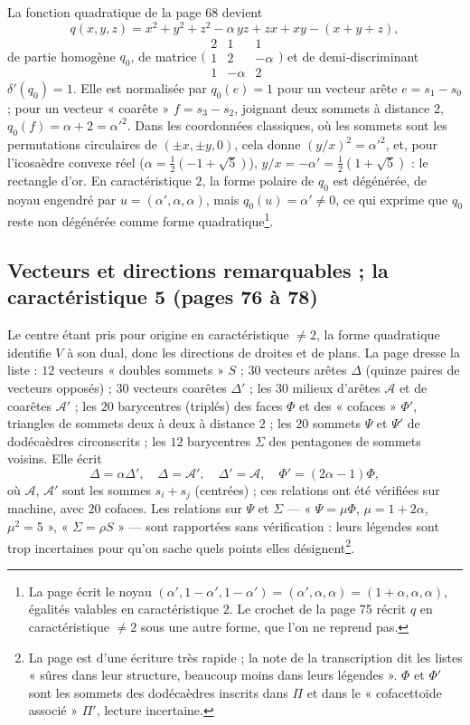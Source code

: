\documentclass[11pt,a4paper]{article}
\begin{document}
La fonction quadratique de la page 68 devient
\[
q(x, y, z) = x^2 + y^2 + z^2 - \alpha\,yz + zx + xy - (x + y + z) ,
\]
de partie homogène $q_0$, de matrice $\bigl(\begin{smallmatrix} 2 & 1 & 1 \\ 1 & 2
& -\alpha \\ 1 & -\alpha & 2 \end{smallmatrix}\bigr)$ et de demi-discriminant
$\delta'(q_0) = 1$. Elle est normalisée par $q_0(e) = 1$ pour un vecteur arête
$e = s_1 - s_0$ ; pour un vecteur « coarête » $f = s_3 - s_2$, joignant deux
sommets à distance $2$, $q_0(f) = \alpha + 2 = \alpha'^2$. Dans les coordonnées
classiques, où les sommets sont les permutations circulaires de $(\pm x, \pm y,
0)$, cela donne $(y/x)^2 = \alpha'^2$, et, pour l'icosaèdre convexe réel ($\alpha
= \tfrac12(-1 + \sqrt 5)$), $y/x = -\alpha' = \tfrac12(1 + \sqrt 5)$ : le
rectangle d'or. En caractéristique $2$, la forme polaire de $q_0$ est
dégénérée, de noyau engendré par $u = (\alpha', \alpha, \alpha)$, mais $q_0(u) =
\alpha' \neq 0$, ce qui exprime que $q_0$ reste non dégénérée comme forme
quadratique\footnote{La page écrit le noyau $(\alpha', 1 - \alpha', 1 - \alpha')
= (\alpha', \alpha, \alpha) = (1 + \alpha, \alpha, \alpha)$, égalités valables en
caractéristique $2$. Le crochet de la page 75 récrit $q$ en caractéristique
$\neq 2$ sous une autre forme, que l'on ne reprend pas.}.

\subsection*{Vecteurs et directions remarquables ; la caractéristique 5 (pages 76 à 78)}

Le centre étant pris pour origine en caractéristique $\neq 2$, la forme
quadratique identifie $V$ à son dual, donc les directions de droites et de
plans. La page dresse la liste : $12$ vecteurs « doubles sommets » $S$ ; $30$
vecteurs arêtes $\Delta$ (quinze paires de vecteurs opposés) ; $30$ vecteurs
coarêtes $\Delta'$ ; les $30$ milieux d'arêtes $\mathcal{A}$ et de coarêtes
$\mathcal{A}'$ ; les $20$ barycentres (triplés) des faces $\Phi$ et des
« cofaces » $\Phi'$, triangles de sommets deux à deux à distance $2$ ; les
$20$ sommets $\Psi$ et $\Psi'$ de dodécaèdres circonscrits ; les $12$
barycentres $\Sigma$ des pentagones de sommets voisins. Elle écrit
\[
\Delta = \alpha\Delta', \quad \Delta = \mathcal{A}', \quad \Delta' = \mathcal{A},
\quad \Phi' = (2\alpha - 1)\Phi ,
\]
où $\mathcal{A}$, $\mathcal{A}'$ sont les sommes $s_i + s_j$ (centrées) ; ces
relations ont été vérifiées sur machine, avec $20$ cofaces. Les relations sur
$\Psi$ et $\Sigma$ --- « $\Psi = \mu\Phi$, $\mu = 1 + 2\alpha$, $\mu^2 = 5$ »,
« $\Sigma = \rho S$ » --- sont rapportées sans vérification : leurs légendes
sont trop incertaines pour qu'on sache quels points elles désignent\footnote{La
page est d'une écriture très rapide ; la note de la transcription dit les
listes « sûres dans leur structure, beaucoup moins dans leurs légendes ».
$\Phi$ et $\Phi'$ sont les sommets des dodécaèdres inscrits dans $\Pi$ et dans
le « cofacettoïde associé » $\Pi'$, lecture incertaine.}.
\end{document}
